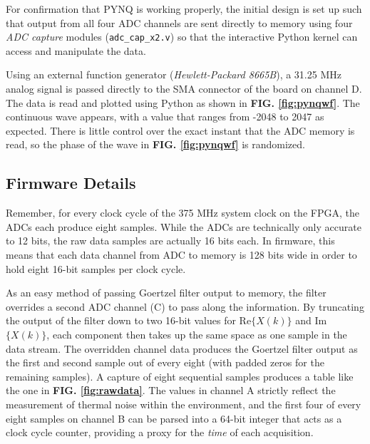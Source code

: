\documentclass[reprint,amsmath,amssymb,aps,pra]{revtex4-2}
\begin{document}
For confirmation that PYNQ is working properly, the initial design is set up such that output from all four ADC channels are sent directly to memory using four \textit{ADC capture} modules (\verb|adc_cap_x2.v|) so that the interactive Python kernel can access and manipulate the data. 

Using an external function generator (\textit{Hewlett-Packard 8665B}), a 31.25 MHz analog signal is passed directly to the SMA connector of the board on channel D. The data is read and plotted using Python as shown in \textbf{FIG. \ref{fig:pynqwf}}. The continuous wave appears, with a value that ranges from -2048 to 2047 as expected. There is little control over the exact instant that the ADC memory is read, so the phase of the wave in \textbf{FIG. \ref{fig:pynqwf}} is randomized.

\subsection{Firmware Details}

Remember, for every clock cycle of the 375 MHz system clock on the FPGA, the ADCs each produce eight samples. While the ADCs are technically only accurate to 12 bits, the raw data samples are actually 16 bits each. In firmware, this means that each data channel from ADC to memory is 128 bits wide in order to hold eight 16-bit samples per clock cycle.

As an easy method of passing Goertzel filter output to memory, the filter overrides a second ADC channel (C) to pass along the information. By truncating the output of the filter down to two 16-bit values for Re$\{X(k)\}$ and Im$\{X(k)\}$, each component then takes up the same space as one sample in the data stream. The overridden channel data produces the Goertzel filter output as the first and second sample out of every eight (with padded zeros for the remaining samples). A capture of eight sequential samples produces a table like the one in \textbf{FIG. \ref{fig:rawdata}}. The values in channel A strictly reflect the measurement of thermal noise within the environment, and the first four of every eight samples on channel B can be parsed into a 64-bit integer that acts as a clock cycle counter, providing a proxy for the \textit{time} of each acquisition.
\end{document}
